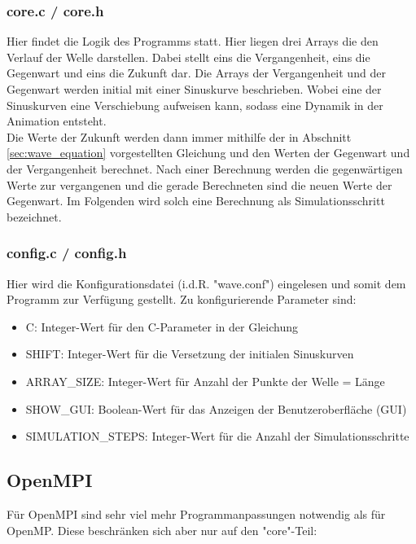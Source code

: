 \subsubsection{core.c / core.h}
Hier findet die Logik des Programms statt. Hier liegen drei Arrays die den Verlauf der Welle darstellen. Dabei stellt eins die Vergangenheit, eins die Gegenwart und eins die Zukunft dar. Die Arrays der Vergangenheit und der Gegenwart werden initial mit einer Sinuskurve beschrieben. Wobei eine der Sinuskurven eine Verschiebung aufweisen kann, sodass eine Dynamik in der Animation entsteht.\\
Die Werte der Zukunft werden dann immer mithilfe der in Abschnitt \ref{sec:wave_equation} vorgestellten Gleichung und den Werten der Gegenwart und der Vergangenheit berechnet. Nach einer Berechnung werden die gegenwärtigen Werte zur vergangenen und die gerade Berechneten sind die neuen Werte der Gegenwart. Im Folgenden wird solch eine Berechnung als Simulationsschritt bezeichnet.

\subsubsection{config.c / config.h}
Hier wird die Konfigurationsdatei (i.d.R. "wave.conf") eingelesen und somit dem Programm zur Verfügung gestellt. Zu konfigurierende Parameter sind:
\begin{itemize}
	\item C: Integer-Wert für den C-Parameter in der Gleichung
	\item SHIFT: Integer-Wert für die Versetzung der initialen Sinuskurven
	\item ARRAY\_SIZE: Integer-Wert für Anzahl der Punkte der Welle = Länge
	\item SHOW\_GUI: Boolean-Wert für das Anzeigen der Benutzeroberfläche (GUI)
	\item SIMULATION\_STEPS: Integer-Wert für die Anzahl der Simulationsschritte
\end{itemize}

\subsection{OpenMPI}
Für OpenMPI sind sehr viel mehr Programmanpassungen notwendig als für OpenMP. Diese beschränken sich aber nur auf den "core"-Teil:


